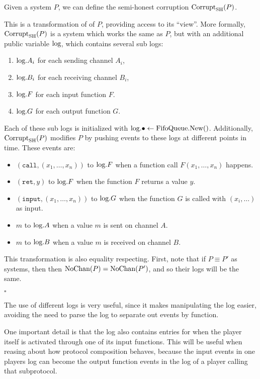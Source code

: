 \begin{definition}
Given a system $P$, we can define
the semi-honest corruption $\text{Corrupt}_{\text{SH}}(P)$.

This is a transformation of
of $P$, providing access to its ``view''.
More formally, $\text{Corrupt}_{\text{SH}}(P)$ is a system which works the same
as $P$, but with an additional public variable $\text{log}$,
which contains several sub logs:
\begin{enumerate}
  \item $\text{log}.{A_i}$ for each sending channel $A_i$,
  \item $\text{log}.{B_i}$ for each receiving channel $B_i$,
  \item $\text{log}.F$ for each input function $F$.
  \item $\text{log}.G$ for each output function $G$.
\end{enumerate}
Each of these sub logs is initialized with ${\text{log}.\bullet \gets \text{FifoQueue.New()}}$.
Additionally, $\text{Corrupt}_{\text{SH}}(P)$ modifies $P$ by pushing events to these
logs at different points in time.
These events are:
\begin{itemize}
\item $(\texttt{call}, (x_1, \ldots, x_n))$ to $\text{log}.F$ when a function call $F(x_1, \ldots, x_n)$ happens.
\item $(\texttt{ret}, y)$ to $\text{log}.F$ when the function $F$ returns a value $y$.
\item $(\texttt{input}, (x_1, \ldots, x_n))$ to $\text{log}.G$ when the function $G$ is called with $(x_i, \ldots)$ as input.
\item $m$ to $\text{log}.A$ when a value $m$ is sent on channel $A$.
\item $m$ to $\text{log}.B$ when a value $m$ is received on channel $B$.
\end{itemize}

This transformation is also equality respecting.
First, note that if $P \equiv P'$ as systems, then
then $\text{NoChan}(P) = \text{NoChan}(P')$, and so their logs will be the same.

$\square$
\end{definition}
The use of different logs is very useful, since it makes manipulating
the log easier, avoiding the need to parse the log to separate
out events by function.

One important detail is that the log also contains entries
for when the player itself is activated through one of its input functions.
This will be useful when reasing about how protocol composition behaves,
because the input events in one players log can become the output function
events in the log of a player calling that subprotocol.

